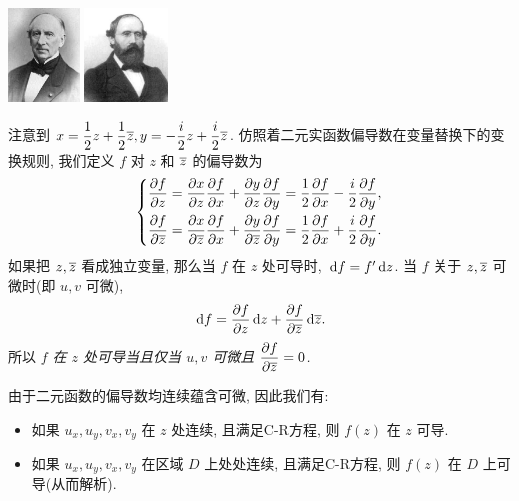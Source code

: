 \documentclass[nocolor,theme=doremi,lang=cn,11pt,chinese,twoside,openright,usesamecnt]{elegantbook}
\begin{document}
\begin{center}
	\includegraphics[height=25mm]{../image/Cauchy.jpeg}
	\hspace{2cm}
	\includegraphics[height=25mm]{../image/Riemann.jpeg}
\end{center}

注意到 $x=\dfrac12z+\dfrac12\overline z,y=-\dfrac i2z+\dfrac i2\overline z$.
仿照着二元实函数偏导数在变量替换下的变换规则, 我们定义 $f$ 对 $z$ 和 $\overline z$ 的偏导数为
\[\left\{
\begin{aligned}
	\frac{\partial f}{\partial z}&
=\frac{\partial x}{\partial z}\frac{\partial f}{\partial x}
	+\frac{\partial y}{\partial z}\frac{\partial f}{\partial y}
=\frac12\frac{\partial f}{\partial x}-\frac i2\frac{\partial f}{\partial y},\\
	\frac{\partial f}{\partial \overline z}&
=\frac{\partial x}{\partial \overline z}\frac{\partial f}{\partial x}
	+\frac{\partial y}{\partial \overline z}\frac{\partial f}{\partial y}
=\frac12\frac{\partial f}{\partial x}+\frac i2\frac{\partial f}{\partial y}.
\end{aligned}\right.\]
如果把 $z,\overline z$ 看成独立变量, 那么当 $f$ 在 $z$ 处可导时,
$\,\mathrm{d} f=f'\,\mathrm{d} z$.
当 $f$ 关于 $z,\overline z$ 可微时(即 $u,v$ 可微),
\[\,\mathrm{d} f=\frac{\partial f}{\partial z}\,\mathrm{d} z+\frac{\partial f}{\partial \overline z}\,\mathrm{d}\overline z.\]
所以 \emph{$f$ 在 $z$ 处可导当且仅当 $u,v$ 可微且 $\dfrac{\partial f}{\partial \overline z}=0$.}

由于二元函数的偏导数均连续蕴含可微, 因此我们有:

\begin{theorem}
	\begin{itemize}
		\item 如果 $u_x,u_y,v_x,v_y$ 在 $z$ 处连续, 且满足C-R方程, 则 $f(z)$ 在 $z$ 可导.
		\item 如果 $u_x,u_y,v_x,v_y$ 在区域 $D$ 上处处连续, 且满足C-R方程, 则 $f(z)$ 在 $D$ 上可导(从而解析).
	\end{itemize}
\end{theorem}
\end{document}
